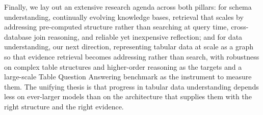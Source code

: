 Finally, we lay out an extensive research agenda across both pillars: for schema understanding, continually evolving knowledge bases, retrieval that scales by addressing pre-computed structure rather than searching at query time, cross-database join reasoning, and reliable yet inexpensive reflection; and for data understanding, our next direction, representing tabular data at scale as a graph so that evidence retrieval becomes addressing rather than search, with robustness on complex table structures and higher-order reasoning as the targets and a large-scale Table Question Answering benchmark as the instrument to measure them. The unifying thesis is that progress in tabular data understanding depends less on ever-larger models than on the architecture that supplies them with the right structure and the right evidence.
